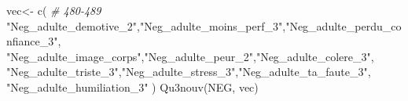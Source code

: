 \documentclass[
]{article}
\newenvironment{Shaded}{\begin{snugshade}}{\end{snugshade}}
\newcommand{\CommentTok}[1]{\textcolor[rgb]{0.56,0.35,0.01}{\textit{#1}}}
\newcommand{\FunctionTok}[1]{\textcolor[rgb]{0.00,0.00,0.00}{#1}}
\newcommand{\NormalTok}[1]{#1}
\newcommand{\OtherTok}[1]{\textcolor[rgb]{0.56,0.35,0.01}{#1}}
\newcommand{\StringTok}[1]{\textcolor[rgb]{0.31,0.60,0.02}{#1}}
\begin{document}
\begin{Shaded}
\begin{Highlighting}[]
\NormalTok{vec}\OtherTok{\textless{}{-}} \FunctionTok{c}\NormalTok{(  }\CommentTok{\# 480{-}489}
  \StringTok{"Neg\_adulte\_demotive\_2"}\NormalTok{,}\StringTok{"Neg\_adulte\_moins\_perf\_3"}\NormalTok{,}\StringTok{"Neg\_adulte\_perdu\_confiance\_3"}\NormalTok{,}
  \StringTok{"Neg\_adulte\_image\_corps"}\NormalTok{,}\StringTok{"Neg\_adulte\_peur\_2"}\NormalTok{,}\StringTok{"Neg\_adulte\_colere\_3"}\NormalTok{,}
  \StringTok{"Neg\_adulte\_triste\_3"}\NormalTok{,}\StringTok{"Neg\_adulte\_stress\_3"}\NormalTok{,}\StringTok{"Neg\_adulte\_ta\_faute\_3"}\NormalTok{,}
  \StringTok{"Neg\_adulte\_humiliation\_3"}
\NormalTok{  )}
\FunctionTok{Qu3nouv}\NormalTok{(NEG, vec)}
\end{Highlighting}
\end{Shaded}
\end{document}
